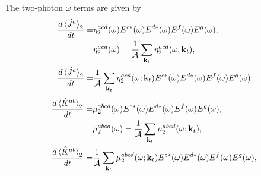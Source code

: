 \documentclass{article}
\newcommand{\kt}{\mathbf{k}_{t}}
\begin{document}
The two-photon $\omega$ terms are given by
\begin{align}
\frac{d\ev*{\hat{J}^{a}}_{2}}{dt} =& \eta^{acd}_{2}(\omega) E^{c*}(\omega)
E^{d*}(\omega) E^{f}(\omega) E^{g}(\omega), \nonumber \\ 
& \eta^{acd}_{2}(\omega) = \frac{1}{\mathcal{A}} \sum_{\kt} \eta^{acd}_{2}
(\omega;\kt), \nonumber \\
\frac{d\ev*{\hat{J}^{a}}_{2}}{dt} =& \frac{1}{\mathcal{A}} \sum_{\kt} 
\eta^{acd}_{2} (\omega;\kt) E^{c*}(\omega) E^{d*}(\omega) E^{f}(\omega) 
E^{g}(\omega) \label{eq:J_2-1w}
\end{align}
\begin{align}
\frac{d\ev*{\hat{K}^{ab}}_{2}}{dt} =& \mu^{abcd}_{2}(\omega)
E^{c*}(\omega) E^{d*}(\omega) E^{f}(\omega) E^{g}(\omega), \nonumber \\ 
& \mu^{abcd}_{2}(\omega) = \frac{1}{\mathcal{A}} \sum_{\kt} \mu^{abcd}_{2}
(\omega;\kt) , \nonumber \\
\frac{d\ev*{\hat{K}^{ab}}_{2}}{dt} =& \frac{1}{\mathcal{A}} \sum_{\kt} 
\mu^{abcd}_{2}(\omega;\kt) E^{c*}(\omega) E^{d*}(\omega) E^{f}(\omega) 
E^{g}(\omega), \label{eq:K_2-1w}
\end{align}
\end{document}
